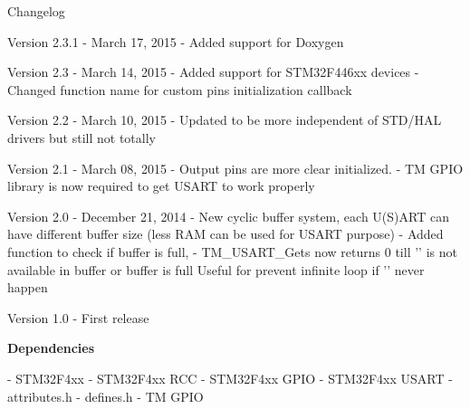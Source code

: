 \begin{DoxyParagraph}{Changelog}

\end{DoxyParagraph}
\begin{DoxyVerb} Version 2.3.1
   - March 17, 2015
   - Added support for Doxygen
   
 Version 2.3
   - March 14, 2015
   - Added support for STM32F446xx devices
   - Changed function name for custom pins initialization callback

 Version 2.2
   - March 10, 2015
   - Updated to be more independent of STD/HAL drivers but still not totally

 Version 2.1
   - March 08, 2015
   - Output pins are more clear initialized. 
   - TM GPIO library is now required to get USART to work properly

 Version 2.0
   - December 21, 2014
   - New cyclic buffer system,
      each U(S)ART can have different buffer size (less RAM can be used for USART purpose)
   - Added function to check if buffer is full,
   - TM_USART_Gets now returns 0 till '\n' is not available in buffer or buffer is full
      Useful for prevent infinite loop if '\n' never happen
      
 Version 1.0
   - First release
\end{DoxyVerb}


{\bfseries Dependencies} 

\begin{DoxyVerb} - STM32F4xx
 - STM32F4xx RCC
 - STM32F4xx GPIO
 - STM32F4xx USART
 - attributes.h
 - defines.h
 - TM GPIO
\end{DoxyVerb}
 